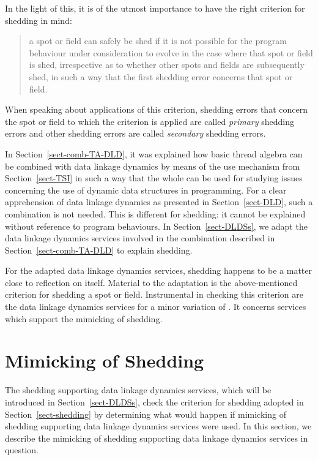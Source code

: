 \documentclass[fleqn]{llncs}
\begin{document}
In the light of this, it is of the utmost importance to have the right
criterion for shedding in mind:
\begin{quote}
a spot or field can safely be shed if it is not possible for the program
behaviour under consideration to evolve in the case where that spot or
field is shed, irrespective as to whether other spots and fields are
subsequently shed, in such a way that the first shedding error concerns
that spot or field.
\end{quote}
When speaking about applications of this criterion, shedding errors that
concern the spot or field to which the criterion is applied are called
\emph{primary} shedding errors and other shedding errors are called
\emph{secondary} shedding errors.

In Section~\ref{sect-comb-TA-DLD}, it was explained how basic thread
algebra can be combined with data linkage dynamics by means of the use
mechanism from Section~\ref{sect-TSI} in such a way that the whole can
be used for studying issues concerning the use of dynamic data
structures in programming.
For a clear apprehension of data linkage dynamics as presented in
Section~\ref{sect-DLD}, such a combination is not needed.
This is different for shedding: it cannot be explained without reference
to program behaviours.
In Section~\ref{sect-DLDSs}, we adapt the data linkage dynamics services
involved in the combination described in Section~\ref{sect-comb-TA-DLD}
to explain shedding.

For the adapted data linkage dynamics services, shedding happens to be a
matter close to reflection on itself.
Material to the adaptation is the above-mentioned criterion for shedding
a spot or field.
Instrumental in checking this criterion are the data linkage dynamics
services for a minor variation of \DLD.
It concerns services which support the mimicking of shedding.

\section{Mimicking of Shedding}
\label{sect-DLDSm}

The shedding supporting data linkage dynamics services, which will be
introduced in Section~\ref{sect-DLDSs}, check the criterion for shedding
adopted in Section~\ref{sect-shedding} by determining what would happen
if mimicking of shedding supporting data linkage dynamics services were
used.
In this section, we describe the mimicking of shedding supporting data
linkage dynamics services in question.
\end{document}
